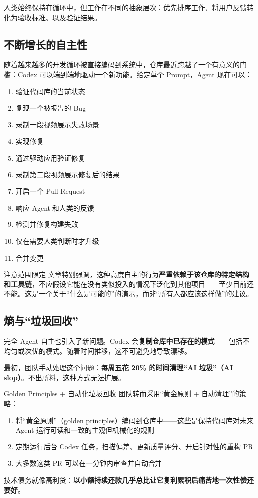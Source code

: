 \documentclass[a4paper]{article}
\begin{document}
人类始终保持在循环中，但工作在不同的抽象层次：优先排序工作、将用户反馈转化为验收标准、以及验证结果。

\subsection{不断增长的自主性}

随着越来越多的开发循环被直接编码到系统中，仓库最近跨越了一个有意义的门槛：Codex 可以端到端地驱动一个新功能。给定单个 Prompt，Agent 现在可以：

\begin{enumerate}[nosep]
  \item 验证代码库的当前状态
  \item 复现一个被报告的 Bug
  \item 录制一段视频展示失败场景
  \item 实现修复
  \item 通过驱动应用验证修复
  \item 录制第二段视频展示修复后的结果
  \item 开启一个 Pull Request
  \item 响应 Agent 和人类的反馈
  \item 检测并修复构建失败
  \item 仅在需要人类判断时才升级
  \item 合并变更
\end{enumerate}

\begin{knowledgebox}{注意范围限定}
文章特别强调，这种高度自主的行为\textbf{严重依赖于该仓库的特定结构和工具链}，不应假设它能在没有类似投入的情况下泛化到其他项目——至少目前还不能。这是一个关于``什么是可能的''的演示，而非``所有人都应该这样做''的建议。
\end{knowledgebox}

\subsection{熵与``垃圾回收''}

完全 Agent 自主也引入了新问题。Codex 会\textbf{复制仓库中已存在的模式}——包括不均匀或次优的模式。随着时间推移，这不可避免地导致漂移。

最初，团队手动处理这个问题：\textbf{每周五花 20\% 的时间清理``AI 垃圾''（AI slop）}。不出所料，这种方式无法扩展。

\begin{importantbox}{Golden Principles + 自动化垃圾回收}
团队转而采用``黄金原则 + 自动清理''的策略：
\begin{enumerate}[nosep]
  \item 将``黄金原则''（golden principles）编码到仓库中——这些是保持代码库对未来 Agent 运行可读和一致的主观但机械化的规则
  \item 定期运行后台 Codex 任务，扫描偏差、更新质量评分、开启针对性的重构 PR
  \item 大多数这类 PR 可以在一分钟内审查并自动合并
\end{enumerate}
技术债务就像高利贷：\textbf{以小额持续还款几乎总比让它复利累积后痛苦地一次性偿还要好}。
\end{importantbox}
\end{document}
